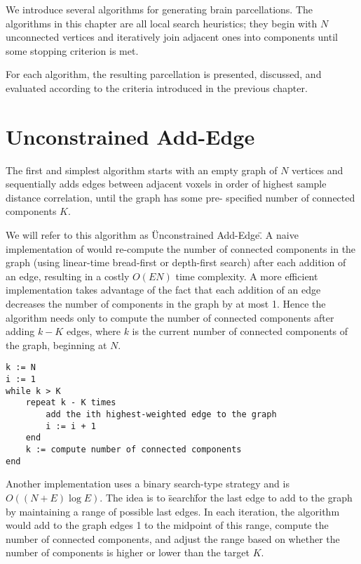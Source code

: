 
We introduce several algorithms for generating brain parcellations. The
algorithms in this chapter are all local search heuristics; they begin
with $N$ unconnected vertices and iteratively join adjacent ones into
components until some stopping criterion is met.

For each algorithm, the resulting parcellation is presented, discussed,
and evaluated according to the criteria introduced in the previous
chapter.

\section{Unconstrained Add-Edge}

The first and simplest algorithm starts with an empty graph of $N$
vertices and sequentially adds edges between adjacent voxels in order of
highest sample distance correlation, until the graph has some pre-
specified number of connected components $K$.

We will refer to this algorithm as \"Unconstrained Add-Edge\". A naive
implementation of would re-compute the number of connected components in
the graph (using linear-time bread-first or depth-first search) after
each addition of an edge, resulting in a costly $O(EN)$ time complexity.
A more efficient implementation takes advantage of the fact that each
addition of an edge decreases the number of components in the graph by
at most 1. Hence the algorithm needs only to compute the number of
connected components after adding $k - K$ edges, where $k$ is the
current number of connected components of the graph, beginning at $N$.

\begin{verbatim}
k := N
i := 1
while k > K
    repeat k - K times
        add the ith highest-weighted edge to the graph
        i := i + 1
    end
    k := compute number of connected components
end
\end{verbatim}

Another implementation uses a binary search-type strategy and is
$O((N + E) \log E)$. The idea is to \"search\" for the last edge to add
to the graph by maintaining a range of possible last edges. In each
iteration, the algorithm would add to the graph edges 1 to the midpoint
of this range, compute the number of connected components, and adjust
the range based on whether the number of components is higher or lower
than the target $K$.

